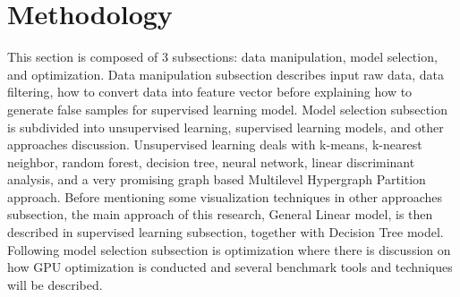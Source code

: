 \documentclass[English]{dicomopapers}
\begin{document}
\section{Methodology}
This section is composed of 3 subsections: data manipulation, model selection, and optimization. Data manipulation subsection describes input raw data, data filtering, how to convert data into feature vector before explaining how to generate false samples for supervised learning model. Model selection subsection is subdivided into unsupervised learning, supervised learning models, and other approaches discussion. Unsupervised learning deals with k-means, k-nearest neighbor, random forest, decision tree, neural network, linear discriminant analysis, and a very promising graph based Multilevel Hypergraph Partition approach. Before mentioning some visualization techniques in other approaches subsection, the main approach of this research, General Linear model, is then described in supervised learning subsection, together with Decision Tree model. Following model selection subsection is optimization where there is discussion on how GPU optimization is conducted and several benchmark tools and techniques will be described.
\end{document}
